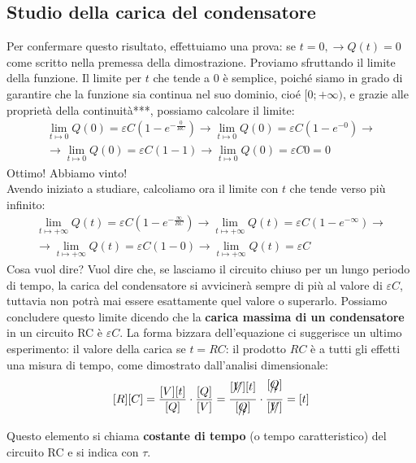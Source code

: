 \documentclass[a3paper, twoside, openany]{book}
\theoremstyle{definition}
\begin{document}
\subsection{Studio della carica del condensatore}
Per confermare questo risultato, effettuiamo una prova: se $t=0,\longrightarrow Q(t)=0$ come scritto nella premessa della dimostrazione. Proviamo sfruttando il limite della funzione. Il limite per $t$ che tende a 0 è semplice, poiché siamo in grado di garantire che la funzione sia continua nel suo dominio, cioé $[0;+\infty)$, e grazie alle proprietà della continuità***, possiamo calcolare il limite: \begin{multline*}\lim_{t\mapsto 0}Q(0)=\varepsilon C \left(1-e^{-\frac{0}{RC}}\right)\longrightarrow \lim_{t\mapsto 0}Q(0)=\varepsilon C \left(1-e^{-0}\right)\longrightarrow \\\longrightarrow \lim_{t\mapsto 0}Q(0)=\varepsilon C (1-1)\longrightarrow \lim_{t\mapsto 0}Q(0)=\varepsilon C 0=0\end{multline*} Ottimo! Abbiamo vinto! \\ Avendo iniziato a studiare, calcoliamo ora il limite con $t$ che tende verso più infinito: \begin{multline*}\lim_{t\mapsto +\infty}Q(t)=\varepsilon C \left(1-e^{-\frac{\infty}{RC}}\right)\longrightarrow \lim_{t\mapsto +\infty}Q(t)=\varepsilon C \left(1-e^{-\infty}\right)\longrightarrow \\\longrightarrow \lim_{t\mapsto +\infty}Q(t)=\varepsilon C (1-0)\longrightarrow\lim_{t\mapsto +\infty} Q(t)=\varepsilon C\end{multline*} Cosa vuol dire? Vuol dire che, se lasciamo il circuito chiuso per un lungo periodo di tempo, la carica del condensatore si avvicinerà sempre di più al valore di $\varepsilon C$, tuttavia non potrà mai essere esattamente quel valore o superarlo. Possiamo concludere questo limite dicendo che la \textbf{carica massima di un condensatore} in un circuito RC è $\varepsilon C$. La forma bizzara dell'equazione ci suggerisce un ultimo esperimento: il valore della carica se $t=RC$: il prodotto $RC$ è a tutti gli effetti una misura di tempo, come dimostrato dall'analisi dimensionale: $$[R][C]=\frac{[V][t]}{[Q]}\cdot\frac{[Q]}{[V]}=\frac{[\xout{V}][t]}{[\xout{Q}]} \cdot \frac{[\xout{Q}]}{[\xout{V}]}=[t] $$ Questo elemento si chiama \textbf{costante di tempo} (o tempo caratteristico) del circuito RC e si indica con $\tau$.
\end{document}
